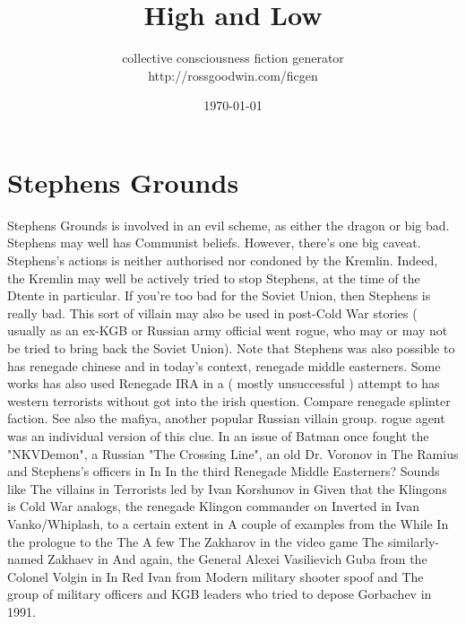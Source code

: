 \documentclass[12pt]{book}
\title{High and Low}
\author{collective consciousness fiction generator\\http://rossgoodwin.com/ficgen}
\date{\today}
\begin{document}
\maketitle


\chapter{Stephens Grounds}
Stephens Grounds is involved in an evil scheme, as either the dragon or big bad. Stephens may well has Communist beliefs. However, there's one big caveat. Stephens's actions is neither authorised nor condoned by the Kremlin. Indeed, the Kremlin may well be actively tried to stop Stephens, at the time of the Dtente in particular. If you're too bad for the Soviet Union, then Stephens is really bad. This sort of villain may also be used in post-Cold War stories ( usually as an ex-KGB or Russian army official went rogue, who may or may not be tried to bring back the Soviet Union). Note that Stephens was also possible to has renegade chinese and in today's context, renegade middle easterners. Some works has also used Renegade IRA in a ( mostly unsuccessful ) attempt to has western terrorists without got into the irish question. Compare renegade splinter faction. See also the mafiya, another popular Russian villain group. rogue agent was an individual version of this clue. In an issue of Batman once fought the "NKVDemon", a Russian "The Crossing Line", an old Dr. Voronov in The Ramius and Stephens's officers in In In the third Renegade Middle Easterners? Sounds like The villains in Terrorists led by Ivan Korshunov in Given that the Klingons is Cold War analogs, the renegade Klingon commander on Inverted in Ivan Vanko/Whiplash, to a certain extent in A couple of examples from the While In the prologue to the The A few The Zakharov in the video game The similarly-named Zakhaev in And again, the General Alexei Vasilievich Guba from the Colonel Volgin in In Red Ivan from Modern military shooter spoof and The group of military officers and KGB leaders who tried to depose Gorbachev in 1991.
\end{document}
